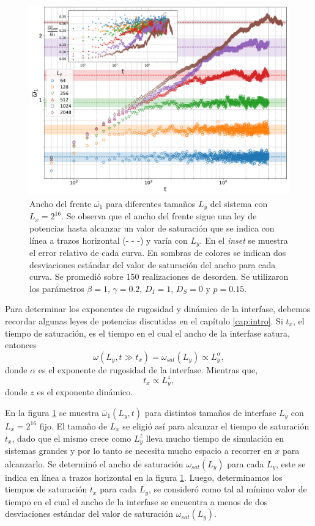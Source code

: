 \begin{figure}[!b]
    \centering
    \includegraphics[width=\imsizeL]{omega1_Ls.pdf}
    \caption{Ancho del frente $\overline{\omega_1}$ para diferentes tamaños $L_y$ del sistema con $L_x = 2^{16}$. Se observa que el ancho del frente sigue una ley de potencias hasta alcanzar un valor de saturación que se indica con línea a trazos horizontal (- - -) y varía con $L_y$. En el \textit{inset} se muestra el error relativo de cada curva. En sombras de colores se indican dos desviaciones estándar del valor de saturación del ancho para cada curva. Se promedió sobre 150 realizaciones de desorden. Se utilizaron los parámetros $\beta = 1$, $\gamma = 0.2$, $D_I = 1$, $D_S = 0$ y $p=0.15$.}
    \label{fig:omega1_Ls}
\end{figure}

Para determinar los exponentes de rugosidad y dinámico de la interfase, debemos recordar algunas leyes de potencias discutidas en el capítulo \ref{cap:intro}. Si $t_x$, el tiempo de saturación, es el tiempo en el cual el ancho de la interfase satura, entonces
\begin{equation}
    \omega(L_y,t \gg t_x) = \omega_{sat}(L_y) \propto L_y^{\alpha},
    \label{eq:omega_sat}
\end{equation}
donde $\alpha$ es el exponente de rugosidad de la interfase. Mientras que,
\begin{equation}
    t_x \propto L_y^z,
    \label{eq:t_x}
\end{equation}
donde $z$ es el exponente dinámico.

En la figura \ref{fig:omega1_Ls} se muestra $\overline{\omega}_1(L_y,t)$ para distintos tamaños de interfase $L_y$ con $L_x = 2^{16}$ fijo. El tamaño de $L_x$ se eligió así para alcanzar el tiempo de saturación $t_x$, dado que el mismo crece como $L^z_y$ lleva mucho tiempo de simulación en sistemas grandes y por lo tanto se necesita mucho espacio a recorrer en $x$ para alcanzarlo. Se determinó el ancho de saturación $\overline{\omega_{sat}(L_y)}$ para cada $L_y$, este se indica en línea a trazos horizontal en la figura \ref{fig:omega1_Ls}. Luego, determinamos los tiempos de saturación $t_x$ para cada $L_y$, se consideró como tal al mínimo valor de tiempo en el cual el ancho de la interfase se encuentra a menos de dos desviaciones estándar del valor de saturación $\omega_{sat}(L_y)$.

